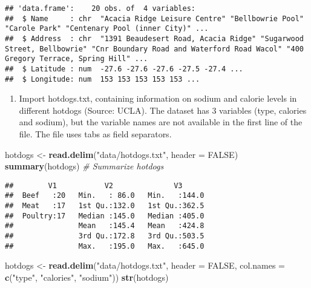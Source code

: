 \documentclass[]{article}
\newenvironment{Shaded}{\begin{snugshade}}{\end{snugshade}}
\newcommand{\KeywordTok}[1]{\textcolor[rgb]{0.13,0.29,0.53}{\textbf{#1}}}
\newcommand{\DataTypeTok}[1]{\textcolor[rgb]{0.13,0.29,0.53}{#1}}
\newcommand{\StringTok}[1]{\textcolor[rgb]{0.31,0.60,0.02}{#1}}
\newcommand{\CommentTok}[1]{\textcolor[rgb]{0.56,0.35,0.01}{\textit{#1}}}
\newcommand{\OtherTok}[1]{\textcolor[rgb]{0.56,0.35,0.01}{#1}}
\newcommand{\NormalTok}[1]{#1}
\providecommand{\tightlist}{%
  \setlength{\itemsep}{0pt}\setlength{\parskip}{0pt}}
\begin{document}
\begin{verbatim}
## 'data.frame':    20 obs. of  4 variables:
##  $ Name     : chr  "Acacia Ridge Leisure Centre" "Bellbowrie Pool" "Carole Park" "Centenary Pool (inner City)" ...
##  $ Address  : chr  "1391 Beaudesert Road, Acacia Ridge" "Sugarwood Street, Bellbowrie" "Cnr Boundary Road and Waterford Road Wacol" "400 Gregory Terrace, Spring Hill" ...
##  $ Latitude : num  -27.6 -27.6 -27.6 -27.5 -27.4 ...
##  $ Longitude: num  153 153 153 153 153 ...
\end{verbatim}

\begin{enumerate}
\def\labelenumi{\arabic{enumi}.}
\setcounter{enumi}{8}
\tightlist
\item
  Import hotdogs.txt, containing information on sodium and calorie
  levels in different hotdogs (Source: UCLA). The dataset has 3
  variables (type, calories and sodium), but the variable names are not
  available in the first line of the file. The file uses tabs as field
  separators.
\end{enumerate}

\begin{Shaded}
\begin{Highlighting}[]
\NormalTok{hotdogs <-}\StringTok{ }\KeywordTok{read.delim}\NormalTok{(}\StringTok{"data/hotdogs.txt"}\NormalTok{, }\DataTypeTok{header =} \OtherTok{FALSE}\NormalTok{)}
\KeywordTok{summary}\NormalTok{(hotdogs) }\CommentTok{# Summarize hotdogs}
\end{Highlighting}
\end{Shaded}

\begin{verbatim}
##        V1           V2              V3       
##  Beef   :20   Min.   : 86.0   Min.   :144.0  
##  Meat   :17   1st Qu.:132.0   1st Qu.:362.5  
##  Poultry:17   Median :145.0   Median :405.0  
##               Mean   :145.4   Mean   :424.8  
##               3rd Qu.:172.8   3rd Qu.:503.5  
##               Max.   :195.0   Max.   :645.0
\end{verbatim}

\begin{Shaded}
\begin{Highlighting}[]
\NormalTok{hotdogs <-}\StringTok{ }\KeywordTok{read.delim}\NormalTok{(}\StringTok{"data/hotdogs.txt"}\NormalTok{, }\DataTypeTok{header =} \OtherTok{FALSE}\NormalTok{, }\DataTypeTok{col.names =} \KeywordTok{c}\NormalTok{(}\StringTok{"type"}\NormalTok{, }\StringTok{"calories"}\NormalTok{, }\StringTok{"sodium"}\NormalTok{))}
\KeywordTok{str}\NormalTok{(hotdogs)}
\end{Highlighting}
\end{Shaded}
\end{document}
